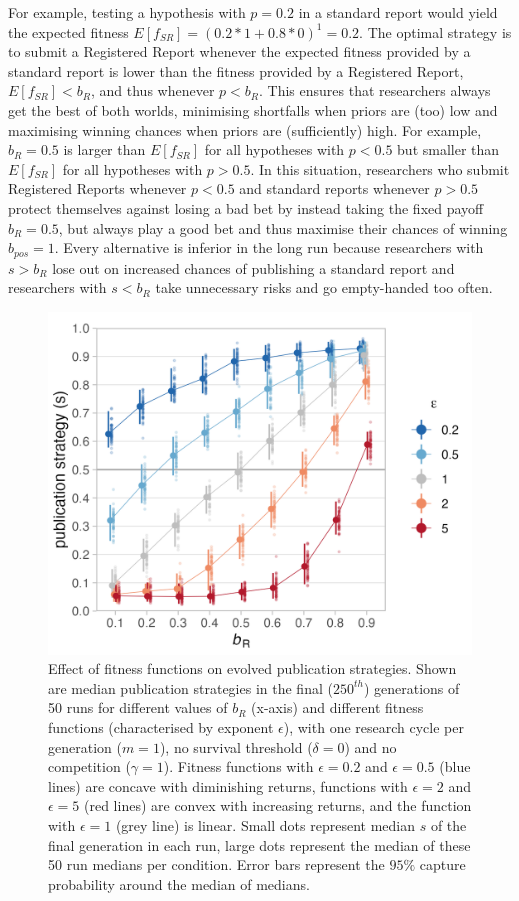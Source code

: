 \documentclass[
  ,man,mask,floatsintext]{apa6}
\begin{document}
For example, testing a hypothesis with \(p = 0.2\) in a standard report would yield the expected fitness \(E[f_{SR}] = (0.2 * 1 + 0.8 * 0)^1 = 0.2\).
The optimal strategy is to submit a Registered Report whenever the expected fitness provided by a standard report is lower than the fitness provided by a Registered Report, \(E[f_{SR}] < b_{R}\), and thus whenever \(p < b_{R}\).
This ensures that researchers always get the best of both worlds, minimising shortfalls when priors are (too) low and maximising winning chances when priors are (sufficiently) high.
For example, \(b_{R} = 0.5\) is larger than \(E[f_{SR}]\) for all hypotheses with \(p < 0.5\) but smaller than \(E[f_{SR}]\) for all hypotheses with \(p > 0.5\).
In this situation, researchers who submit Registered Reports whenever \(p<0.5\) and standard reports whenever \(p>0.5\) protect themselves against losing a bad bet by instead taking the fixed payoff \(b_{R} = 0.5\), but always play a good bet and thus maximise their chances of winning \(b_{pos} = 1\).
Every alternative is inferior in the long run because researchers with \(s > b_{R}\) lose out on increased chances of publishing a standard report and researchers with \(s < b_{R}\) take unnecessary risks and go empty-handed too often.



\begin{figure}

{\centering \includegraphics[width=0.65\linewidth]{../plots/plot_epsilon_line_evo} 

}

\caption{Effect of fitness functions on evolved publication strategies. Shown are median publication strategies in the final (\(250^{th}\)) generations of 50 runs for different values of \(b_{R}\) (x-axis) and different fitness functions (characterised by exponent \(\epsilon\)), with one research cycle per generation (\(m = 1\)), no survival threshold (\(\delta = 0\)) and no competition (\(\gamma = 1\)). Fitness functions with \(\epsilon = 0.2\) and \(\epsilon = 0.5\) (blue lines) are concave with diminishing returns, functions with \(\epsilon = 2\) and \(\epsilon = 5\) (red lines) are convex with increasing returns, and the function with \(\epsilon = 1\) (grey line) is linear. Small dots represent median \(s\) of the final generation in each run, large dots represent the median of these 50 run medians per condition. Error bars represent the \(95\%\) capture probability around the median of medians.}\label{fig:epsilonplot}
\end{figure}
\end{document}
